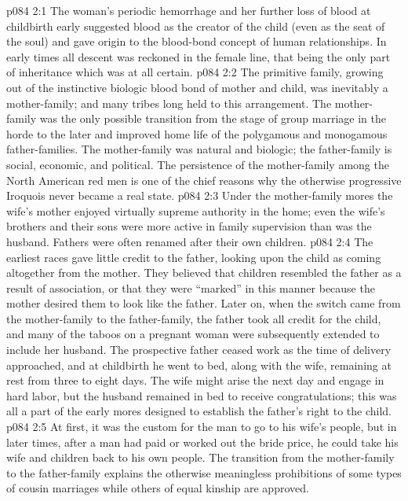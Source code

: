 \vs p084 2:1 The woman’s periodic hemorrhage and her further loss of blood at childbirth early suggested blood as the creator of the child (even as the seat of the soul) and gave origin to the blood\hyp{}bond concept of human relationships. In early times all descent was reckoned in the female line, that being the only part of inheritance which was at all certain.
\vs p084 2:2 The primitive family, growing out of the instinctive biologic blood bond of mother and child, was inevitably a mother\hyp{}family; and many tribes long held to this arrangement. The mother\hyp{}family was the only possible transition from the stage of group marriage in the horde to the later and improved home life of the polygamous and monogamous father\hyp{}families. The mother\hyp{}family was natural and biologic; the father\hyp{}family is social, economic, and political. The persistence of the mother\hyp{}family among the North American red men is one of the chief reasons why the otherwise progressive Iroquois never became a real state.
\vs p084 2:3 Under the mother\hyp{}family mores the wife’s mother enjoyed virtually supreme authority in the home; even the wife’s brothers and their sons were more active in family supervision than was the husband. Fathers were often renamed after their own children.
\vs p084 2:4 The earliest races gave little credit to the father, looking upon the child as coming altogether from the mother. They believed that children resembled the father as a result of association, or that they were “marked” in this manner because the mother desired them to look like the father. Later on, when the switch came from the mother\hyp{}family to the father\hyp{}family, the father took all credit for the child, and many of the taboos on a pregnant woman were subsequently extended to include her husband. The prospective father ceased work as the time of delivery approached, and at childbirth he went to bed, along with the wife, remaining at rest from three to eight days. The wife might arise the next day and engage in hard labor, but the husband remained in bed to receive congratulations; this was all a part of the early mores designed to establish the father’s right to the child.
\vs p084 2:5 At first, it was the custom for the man to go to his wife’s people, but in later times, after a man had paid or worked out the bride price, he could take his wife and children back to his own people. The transition from the mother\hyp{}family to the father\hyp{}family explains the otherwise meaningless prohibitions of some types of cousin marriages while others of equal kinship are approved.
